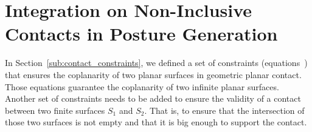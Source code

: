 \section{Integration on Non-Inclusive Contacts in Posture Generation}
\label{sec:integration_on_non_inclusive_contacts_in_posture generation}


In Section~\ref{sub:contact_constraints}, we defined a set of constraints (equations~) that ensures the coplanarity of two planar surfaces in geometric planar contact.
Those equations guarantee the coplanarity of two infinite planar surfaces.
Another set of constraints needs to be added to ensure the validity of a contact between two finite surfaces $S_1$ and $S_2$.
That is, to ensure that the intersection of those two surfaces is not empty and that it is big enough to support the contact.


